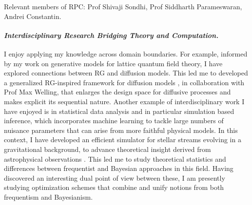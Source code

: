 \documentclass[11pt]{article}
\begin{document}
{\color{royalblue} Relevant members of RPC: Prof Shivaji Sondhi, Prof Siddharth Parameswaran, Andrei Constantin.}

\paragraph{\textit{{Interdisciplinary Research Bridging Theory and Computation.}}}
I enjoy applying my knowledge across domain boundaries.
For example, informed by my work on generative models for lattice quantum field theory, I have explored connections between RG and diffusion models.
This led me to developed a generalized RG-inspired framework for diffusion models \cite{gerdes2024gudgenerationunifieddiffusion}, in collaboration with Prof Max Welling, that enlarges the design space for diffusive processes and makes explicit its sequential nature.
Another example of interdisciplinary work I have enjoyed is in statistical data analysis and in particular simulation based inference, which incorporates machine learning to tackle large numbers of nuisance parameters that can arise from more faithful physical models.
In this context, I have developed an efficient simulator for stellar streams evolving in a gravitational background, to advance theoretical insight derived from astrophysical observations  \cite{alvey2023AlbatrossScalable}.
This led me to study theoretical statistics and differences between frequentist and Bayesian approaches in this field.
Having discovered an interesting dual point of view between these, I am presently studying optimization schemes that combine and unify notions from both frequentism and Bayesianism.






{
    \small
    
}
\end{document}
